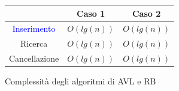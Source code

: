 \begin{figure}[H]
	\centering
	\begin{tabular}{|c|c|c|}
		\hline
		& Caso 1 & Caso 2\\
		\hline
		\textcolor{blue}{Inserimento} & $O(lg(n))$ & $O(lg(n))$\\
		\hline
		Ricerca & $O(lg(n))$ & $O(lg(n))$\\
		\hline
		Cancellazione & $O(lg(n))$ & $O(lg(n))$\\
		\hline
	\end{tabular}
	\caption{Complessità degli algoritmi di AVL e RB}
	\label{fig:ComplessitàAVL}
\end{figure}